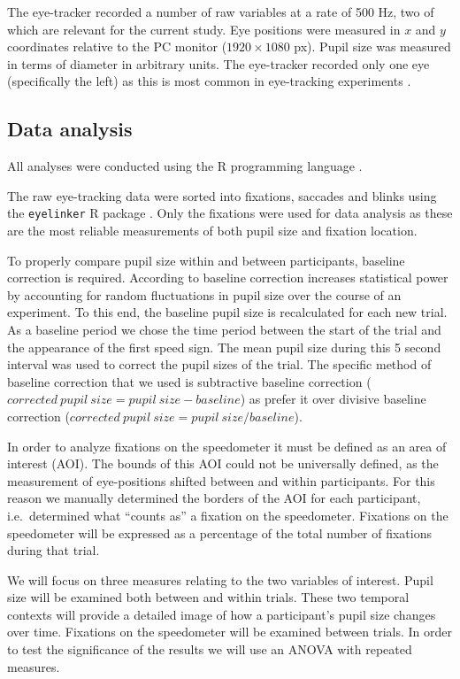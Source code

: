 The eye-tracker recorded a number of raw variables at a rate of 500 Hz, two of which are relevant for the current study.
Eye positions were measured in \(x\) and \(y\) coordinates relative to the PC monitor (\(1920 \times 1080\) px).
Pupil size was measured in terms of diameter in arbitrary units.
The eye-tracker recorded only one eye (specifically the left) as this is most common in eye-tracking experiments \citep{Hutton2019}.

\subsection{Data analysis}
All analyses were conducted using the R programming language \citep{R}.

The raw eye-tracking data were sorted into fixations, saccades and blinks using the \texttt{eyelinker} R package \citep{eyelinker}.
Only the fixations were used for data analysis as these are the most reliable measurements of both pupil size and fixation location.

To properly compare pupil size within and between participants, baseline correction is required. 
According to \citet{Mathot2018} baseline correction increases statistical power by accounting for random fluctuations in pupil size over the course of an experiment.
To this end, the baseline pupil size is recalculated for each new trial.
As a baseline period we chose the time period between the start of the trial and the appearance of the first speed sign.
The mean pupil size during this 5 second interval was used to correct the pupil sizes of the trial.
The specific method of baseline correction that we used is subtractive baseline correction (\(corrected\ pupil\ size = pupil\ size - baseline\)) 
as \citet{Mathot2018} prefer it over divisive baseline correction (\(corrected\ pupil\ size = pupil\ size / baseline\)).

In order to analyze fixations on the speedometer it must be defined as an area of interest (AOI).
The bounds of this AOI could not be universally defined, as the measurement of eye-positions shifted between and within participants.
For this reason we manually determined the borders of the AOI for each participant, i.e.\ determined what ``counts as'' a fixation on the speedometer.
Fixations on the speedometer will be expressed as a percentage of the total number of fixations during that trial.

We will focus on three measures relating to the two variables of interest. 
Pupil size will be examined both between and within trials.
These two temporal contexts will provide a detailed image of how a participant's pupil size changes over time.
Fixations on the speedometer will be examined between trials. 
In order to test the significance of the results we will use an ANOVA with repeated measures.